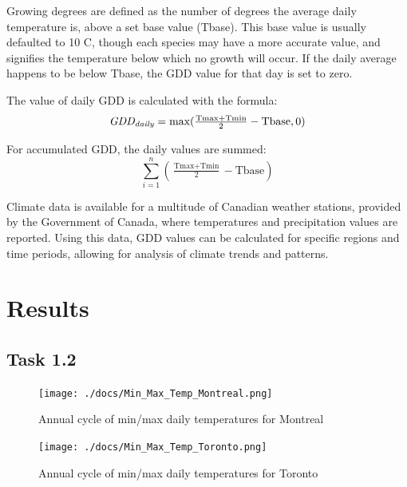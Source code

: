 \documentclass[12pt]{article}
\begin{document}
Growing degrees are defined as the number of degrees the average daily 
temperature is, above a set base value (Tbase). This base value is 
usually defaulted to 10 \degree C, though each species may have a more 
accurate value, and signifies the temperature below which no growth 
will occur. If the daily average happens to be below Tbase, the GDD 
value for that day is set to zero. \\

\bigskip
\par

The value of daily GDD is calculated with the formula:
$$
\textit{GDD\textsubscript{daily}} =  \text{max}( \tfrac{\text{Tmax}+\text{Tmin}}{2}-\text{Tbase}, 0)
$$

\bigskip
\bigskip

For accumulated GDD, the daily values are summed:
$$
\sum_{i=1}^n ( \tfrac{\text{Tmax}+\text{Tmin}}{2}-\text{Tbase})
$$

\bigskip

\par
Climate data is available for a multitude of Canadian weather stations, provided
by the Government of Canada, where temperatures and precipitation values are reported. 
Using this data, GDD values can be calculated for 
specific regions and time periods, allowing for analysis of climate trends and patterns. 



\pagebreak

\section{Results}\label{data analysis}
\subsection{Task 1.2}

\begin{figure}[!htbp]
\centering
\texttt{[image: ./docs/Min\_Max\_Temp\_Montreal.png]} 
\caption{\scriptsize Annual cycle of min/max daily temperatures for Montreal}
\label{minmax_mont}		  
\end{figure}

\begin{figure}[!htbp]
\centering
\texttt{[image: ./docs/Min\_Max\_Temp\_Toronto.png]} 
\caption{\scriptsize Annual cycle of min/max daily temperatures for Toronto}
\label{minmax_tor}		  
\end{figure}
\end{document}
